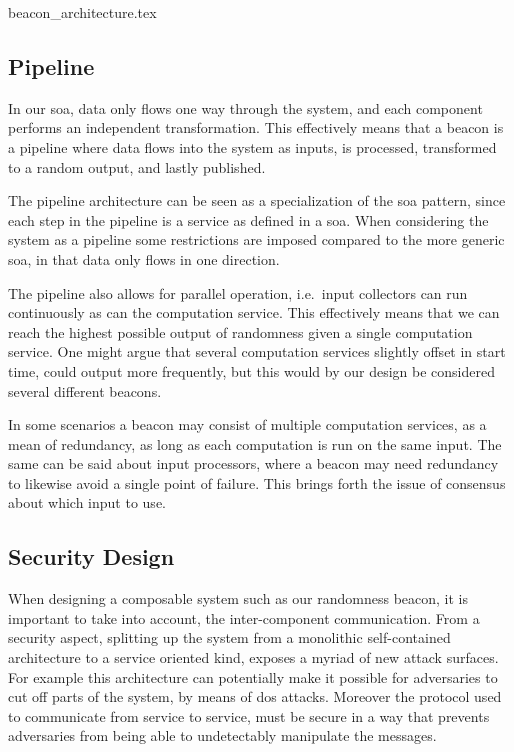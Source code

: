 {beacon_architecture.tex}

\subsection{Pipeline}%
\label{sub:pipeline}
In our \gls{soa}, data only flows one way through the system, and each component performs an independent transformation.
This effectively means that a beacon is a pipeline where data flows into the system as inputs, is processed, transformed to a random output, and lastly published.

The pipeline architecture can be seen as a specialization of the \gls{soa} pattern, since each step in the pipeline is a service as defined in a \gls{soa}.
When considering the system as a pipeline some restrictions are imposed compared to the more generic \gls{soa}, in that data only flows in one direction.

The pipeline also allows for parallel operation, i.e.\ input collectors can run continuously as can the computation service.
This effectively means that we can reach the highest possible output of randomness given a single computation service.
One might argue that several computation services slightly offset in start time, could output more frequently, but this would by our design be considered several different beacons.

In some scenarios a beacon may consist of multiple computation services, as a mean of redundancy, as long as each computation is run on the same input.
The same can be said about input processors, where a beacon may need redundancy to likewise avoid a single point of failure.
This brings forth the issue of consensus about which input to use.


\subsection{Security Design}


When designing a composable system such as our randomness beacon, it is important to take into account, the inter-component communication.
From a security aspect, splitting up the system from a monolithic self-contained architecture to a service oriented kind, exposes a myriad of new attack surfaces.
For example this architecture can potentially make it possible for adversaries to cut off parts of the system, by means of \gls{dos} attacks.
Moreover the protocol used to communicate from service to service, must be secure in a way that prevents adversaries from being able to undetectably manipulate the messages.

